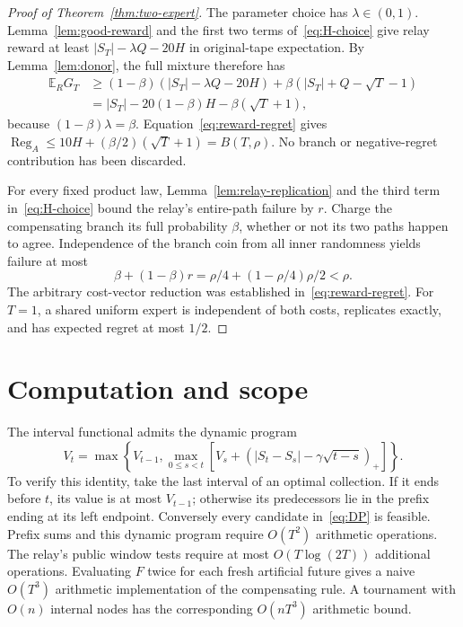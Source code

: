 \documentclass[11pt]{article}
\theoremstyle{remark}\newtheorem{remark}[theorem]{Remark}
\newcommand{\EE}{\mathbb E}
\newcommand{\Reg}{\operatorname{Reg}}
\begin{document}
\begin{proof}[Proof of Theorem~\ref{thm:two-expert}]
The parameter choice has $\lambda\in(0,1)$.
Lemma~\ref{lem:good-reward} and the first two terms
of~\eqref{eq:H-choice} give relay reward at least
$|S_T|-\lambda Q-20H$ in original-tape expectation.
By Lemma~\ref{lem:donor}, the full mixture therefore has
\begin{align*}
 \EE_R G_T
 &\ge(1-\beta)(|S_T|-\lambda Q-20H)
           +\beta(|S_T|+Q-\sqrt T-1)\\
 &=|S_T|-20(1-\beta)H-\beta(\sqrt T+1),
\end{align*}
because $(1-\beta)\lambda=\beta$.
Equation~\eqref{eq:reward-regret} gives
$\Reg_A\le10H+(\beta/2)(\sqrt T+1)=B(T,\rho)$.
No branch or negative-regret contribution has been discarded.

For every fixed product law, Lemma~\ref{lem:relay-replication}
and the third term in~\eqref{eq:H-choice} bound the relay's entire-path
failure by $r$. Charge the compensating branch its full probability
$\beta$, whether or not its two paths happen to agree. Independence of
the branch coin from all inner randomness yields failure at most
\[
 \beta+(1-\beta)r=\rho/4+(1-\rho/4)\rho/2<\rho.
\]
The arbitrary cost-vector reduction was established
in~\eqref{eq:reward-regret}. For $T=1$, a shared uniform expert is
independent of both costs, replicates exactly, and has expected regret
at most $1/2$.
\end{proof}



\section{Computation and scope}\label{sec:scope}
The interval functional admits the dynamic program
\begin{equation}\label{eq:DP}
 V_t=\max\left\{V_{t-1},\max_{0\le s<t}
 \left[V_s+(|S_t-S_s|-\gamma\sqrt{t-s})_+\right]\right\}.
\end{equation}
To verify this identity, take the last interval of an optimal collection.
If it ends before $t$, its value is at most $V_{t-1}$; otherwise its
predecessors lie in the prefix ending at its left endpoint. Conversely
every candidate in~\eqref{eq:DP} is feasible.
Prefix sums and this dynamic program require $O(T^2)$ arithmetic
operations. The relay's public window tests require at most
$O(T\log(2T))$ additional operations. Evaluating $F$ twice for each
fresh artificial future gives a naive $O(T^3)$ arithmetic implementation
of the compensating rule. A tournament with $O(n)$ internal nodes has
the corresponding $O(nT^3)$ arithmetic bound.
\end{document}
